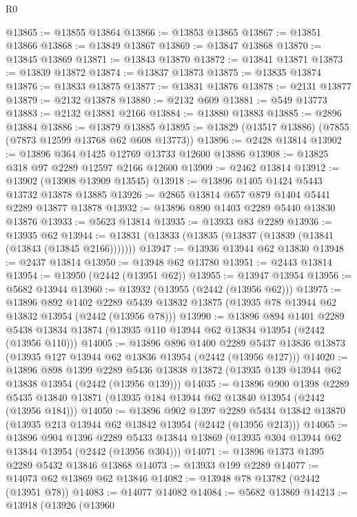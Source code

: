 \begin{lexlean}{R0}
\begin{coremodule}
@13865 := @13855 @13864
@13866 := @13853 @13865
@13867 := @13851 @13866
@13868 := @13849 @13867
@13869 := @13847 @13868
@13870 := @13845 @13869
@13871 := @13843 @13870
@13872 := @13841 @13871
@13873 := @13839 @13872
@13874 := @13837 @13873
@13875 := @13835 @13874
@13876 := @13833 @13875
@13877 := @13831 @13876
@13878 := @2131 @13877
@13879 := @2132 @13878
@13880 := @2132 @609
@13881 := @549 @13773
@13883 := @2132 @13881 @2166
@13884 := @13880 @13883
@13885 := @2896 @13884
@13886 := @13879 @13885
@13895 := @13829 (@13517 @13886) (@7855 (@7873 @12599 @13768 @62 @608 @13773))
@13896 := @2428 @13814
@13902 := @13896 @364 @1425 @12769 @13733 @12600 @13886
@13908 := @13825 @318 @97 @2289 @12597 @2166 @12600
@13909 := @2462 @13814
@13912 := @13902 (@13908 @13909 @13545)
@13918 := @13896 @1405 @1424 @5443 @13732 @13878 @13885
@13926 := @2865 @13814 @657 @879 @1404 @5441 @2289 @13877 @13878
@13932 := @13896 @890 @1403 @2289 @5440 @13830 @13876
@13933 := @5623 @13814
@13935 := @13933 @83 @2289
@13936 := @13935 @62
@13944 := @13831 (@13833 (@13835 (@13837 (@13839 (@13841 (@13843 (@13845 @2166)))))))
@13947 := @13936 @13944 @62 @13830
@13948 := @2437 @13814
@13950 := @13948 @62 @13780
@13951 := @2443 @13814
@13954 := @13950 (@2442 (@13951 @62))
@13955 := @13947 @13954
@13956 := @5682 @13944
@13960 := @13932 (@13955 (@2442 (@13956 @62)))
@13975 := @13896
    @892
    @1402
    @2289
    @5439
    @13832
    @13875
    (@13935 @78 @13944 @62 @13832 @13954 (@2442 (@13956 @78)))
@13990 := @13896
    @894
    @1401
    @2289
    @5438
    @13834
    @13874
    (@13935 @110 @13944 @62 @13834 @13954 (@2442 (@13956 @110)))
@14005 := @13896
    @896
    @1400
    @2289
    @5437
    @13836
    @13873
    (@13935 @127 @13944 @62 @13836 @13954 (@2442 (@13956 @127)))
@14020 := @13896
    @898
    @1399
    @2289
    @5436
    @13838
    @13872
    (@13935 @139 @13944 @62 @13838 @13954 (@2442 (@13956 @139)))
@14035 := @13896
    @900
    @1398
    @2289
    @5435
    @13840
    @13871
    (@13935 @184 @13944 @62 @13840 @13954 (@2442 (@13956 @184)))
@14050 := @13896
    @902
    @1397
    @2289
    @5434
    @13842
    @13870
    (@13935 @213 @13944 @62 @13842 @13954 (@2442 (@13956 @213)))
@14065 := @13896
    @904
    @1396
    @2289
    @5433
    @13844
    @13869
    (@13935 @304 @13944 @62 @13844 @13954 (@2442 (@13956 @304)))
@14071 := @13896 @1373 @1395 @2289 @5432 @13846 @13868
@14073 := @13933 @199 @2289
@14077 := @14073 @62 @13869 @62 @13846
@14082 := @13948 @78 @13782 (@2442 (@13951 @78))
@14083 := @14077 @14082
@14084 := @5682 @13869
@14213 := @13918
    (@13926
      (@13960

\end{coremodule}
\end{lexlean}

